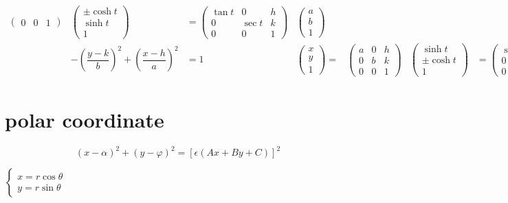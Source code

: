 \documentclass[
]{book}
\theoremstyle{definition}
\theoremstyle{definition}
\theoremstyle{definition}
\theoremstyle{definition}
\theoremstyle{remark}
\begin{document}
\[\begin{array}{cccccccc}
\begin{pmatrix}
0 & 0 & 1
\end{pmatrix} & \begin{pmatrix}\pm\cosh t\\
\sinh t\\
1
\end{pmatrix} & =\begin{pmatrix}\tan t & 0 & h\\
0 & \sec t & k\\
0 & 0 & 1
\end{pmatrix} & \begin{pmatrix}a\\
b\\
1
\end{pmatrix}\\
 & -\left(\dfrac{y-k}{b}\right)^{2}+\left(\dfrac{x-h}{a}\right)^{2} & =1 & \begin{pmatrix}x\\
y\\
1
\end{pmatrix}= & \begin{pmatrix}a & 0 & h\\
0 & b & k\\
0 & 0 & 1
\end{pmatrix} & \begin{pmatrix}\sinh t\\
\pm\cosh t\\
1
\end{pmatrix} & =\begin{pmatrix}\sec t & 0 & h\\
0 & \tan t & k\\
0 & 0 & 1
\end{pmatrix} & \begin{pmatrix}a\\
b\\
1
\end{pmatrix}
\end{array}
\]

\hypertarget{polar-coordinate}{%
\section{polar coordinate}\label{polar-coordinate}}

\[
\left(x-\alpha\right)^{2}+\left(y-\varphi\right)^{2}=\left[\epsilon\left(Ax+By+C\right)\right]^{2}
\]

\(\begin{cases}x=r\cos\theta\\y=r\sin\theta\end{cases}\)
\end{document}
